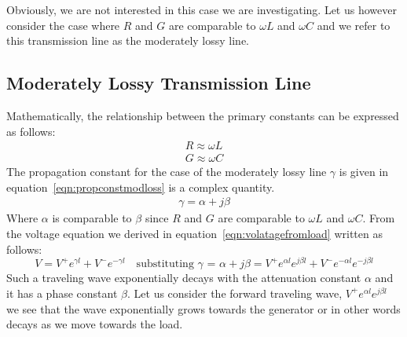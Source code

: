 Obviously, we are not interested in this case we are investigating. Let us however consider the case where $R$ and $G$ are comparable to $\omega L$ and $\omega C$ and we refer to this transmission line as the moderately lossy line.

\subsection{Moderately Lossy Transmission Line}Mathematically, the relationship between the primary constants can be expressed as follows:
\begin{align*}
R \approx \omega L\\
G \approx \omega C
\end{align*}
The propagation constant for the case of the moderately lossy line $\gamma$ is given in equation~\eqref{eqn:propconstmodloss} is a complex quantity.
\begin{align}
\gamma = \alpha +j\beta
\label{eqn:propconstmodloss}
\end{align}
Where $\alpha$ is comparable to $\beta$ since $R$ and $G$ are comparable to $\omega L$ and $\omega C$. From the voltage equation we derived in equation~\eqref{eqn:volatagefromload} written as follows:
\begin{dmath*}
V = V^+e^{\gamma l} + V^-e^{
-\gamma l}\quad\text{substituting }\gamma\text{ = }\alpha + j\beta
= V^+e^{\alpha l}e^{j\beta l} + V^-e^{-\alpha l}e^{-j\beta l}
\end{dmath*}
Such a traveling wave exponentially decays with the attenuation constant $\alpha$ and it has a phase constant $\beta$. Let us consider the forward traveling wave, $V^+e^{\alpha l}e^{j\beta l}$ we see that the wave exponentially grows towards the generator or in other words decays as we move towards the load.

